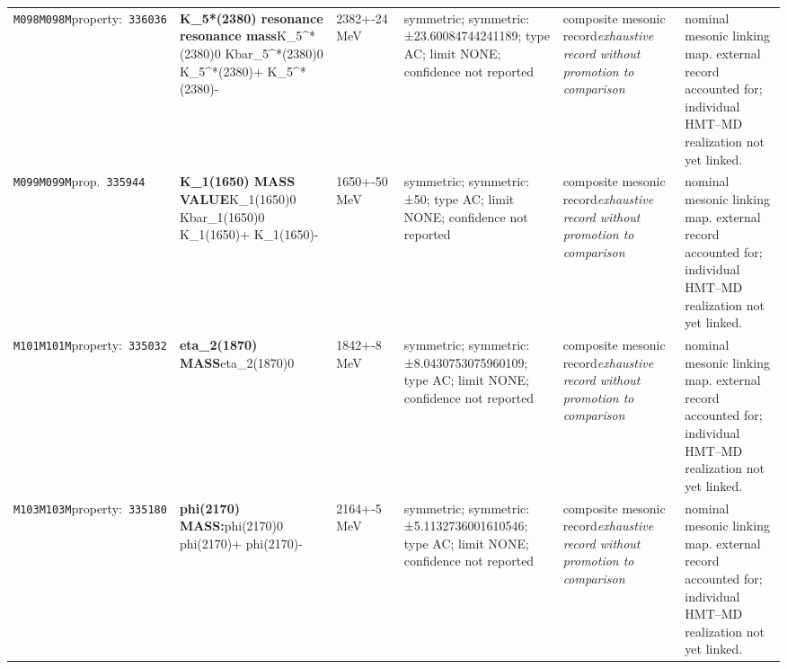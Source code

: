 \begin{landscape}
\begin{longtable}{L{1.85cm}L{4.45cm}L{2.35cm}L{4.05cm}L{3.35cm}L{7.15cm}}
\texttt{M098}\newline \texttt{M098M}\newline property:\ \texttt{336036} & \textbf{K\_\allowbreak{}5*(2380) resonance resonance mass}\newline K\_\allowbreak{}5\textasciicircum{}*(2380)0 \textbar{}\allowbreak{} Kbar\_\allowbreak{}5\textasciicircum{}*(2380)0 \textbar{}\allowbreak{} K\_\allowbreak{}5\textasciicircum{}*(2380)+ \textbar{}\allowbreak{} K\_\allowbreak{}5\textasciicircum{}*(2380)- & 2382+-24\,MeV & symmetric; symmetric: ±23.60084744241189; type AC; limit NONE; confidence not reported & composite mesonic record\newline \emph{exhaustive record without promotion to comparison} & nominal mesonic linking map. external record accounted for; individual HMT--MD realization not yet linked. \\
\texttt{M099}\newline \texttt{M099M}\newline prop.\ \texttt{335944} & \textbf{K\_\allowbreak{}1(1650) MASS VALUE}\newline K\_\allowbreak{}1(1650)0 \textbar{}\allowbreak{} Kbar\_\allowbreak{}1(1650)0 \textbar{}\allowbreak{} K\_\allowbreak{}1(1650)+ \textbar{}\allowbreak{} K\_\allowbreak{}1(1650)- & 1650+-50\,MeV & symmetric; symmetric: ±50; type AC; limit NONE; confidence not reported & composite mesonic record\newline \emph{exhaustive record without promotion to comparison} & nominal mesonic linking map. external record accounted for; individual HMT--MD realization not yet linked. \\
\texttt{M101}\newline \texttt{M101M}\newline property:\ \texttt{335032} & \textbf{eta\_\allowbreak{}2(1870) MASS}\newline eta\_\allowbreak{}2(1870)0 & 1842+-8\,MeV & symmetric; symmetric: ±8.0430753075960109; type AC; limit NONE; confidence not reported & composite mesonic record\newline \emph{exhaustive record without promotion to comparison} & nominal mesonic linking map. external record accounted for; individual HMT--MD realization not yet linked. \\
\texttt{M103}\newline \texttt{M103M}\newline property:\ \texttt{335180} & \textbf{phi(2170) MASS:}\newline phi(2170)0 \textbar{}\allowbreak{} phi(2170)+ \textbar{}\allowbreak{} phi(2170)- & 2164+-5\,MeV & symmetric; symmetric: ±5.1132736001610546; type AC; limit NONE; confidence not reported & composite mesonic record\newline \emph{exhaustive record without promotion to comparison} & nominal mesonic linking map. external record accounted for; individual HMT--MD realization not yet linked. \\

\end{longtable}
\end{landscape}
